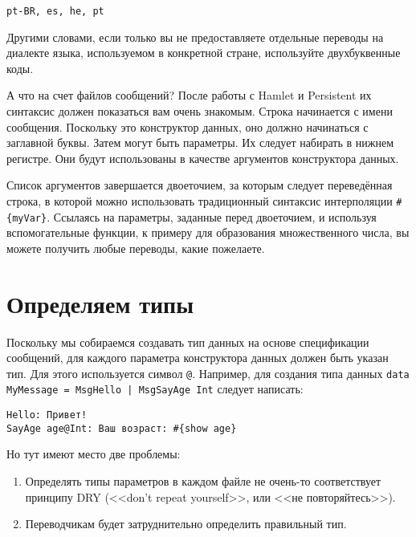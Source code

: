 \begin{lstlisting}
pt-BR, es, he, pt
\end{lstlisting}

Другими словами, если только вы не предоставляете отдельные переводы на диалекте языка, используемом в конкретной стране, используйте двухбуквенные коды.

А что на счет файлов сообщений? После работы с Hamlet и Persistent их синтаксис должен показаться вам очень знакомым. Строка начинается с имени сообщения. Поскольку это конструктор данных, оно должно начинаться с заглавной буквы. Затем могут быть параметры. Их следует набирать в нижнем регистре. Они будут использованы в качестве аргументов конструктора данных.

Список аргументов завершается двоеточием, за которым следует переведённая строка, в которой можно использовать традиционный синтаксис интерполяции \lstinline'#{myVar}'. Ссылаясь на параметры, заданные перед двоеточием, и используя вспомогательные функции, к примеру для образования множественного числа, вы можете получить любые переводы, какие пожелаете.

\section{Определяем типы} %

Поскольку мы собираемся создавать тип данных на основе спецификации сообщений, для каждого параметра конструктора данных должен быть указан тип. Для этого используется символ \verb'@'. Например, для создания типа данных \lstinline'data MyMessage = MsgHello | MsgSayAge Int' следует написать:

\begin{lstlisting}
Hello: Привет!
SayAge age@Int: Ваш возраст: #{show age}
\end{lstlisting}

Но тут имеют место две проблемы:

\begin{enumerate}
  \item Определять типы параметров в каждом файле не очень-то соответствует принципу DRY (<<don't repeat yourself>>, или <<не повторяйтесь>>).
  \item Переводчикам будет затруднительно определить правильный тип.
\end{enumerate}

